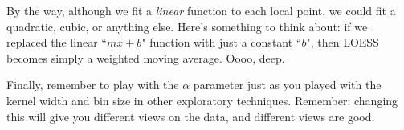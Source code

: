 \documentclass[12pt]{article}
\begin{document}
\vspace{.1in}

By the way, although we fit a \textit{linear} function to each local point, we
could fit a quadratic, cubic, or anything else. Here's something to think
about: if we replaced the linear ``$mx+b$" function with just a constant
``$b$", then LOESS becomes simply a weighted moving average. Oooo, deep.

\vspace{.1in}

Finally, remember to play with the $\alpha$ parameter just as you played with
the kernel width and bin size in other exploratory techniques. Remember:
changing this will give you different views on the data, and different views
are good.
\end{document}
